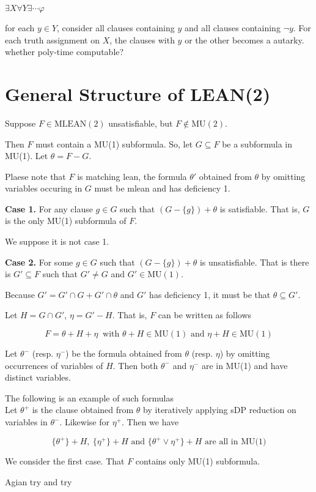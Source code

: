 \documentclass[12pt]{article}
\begin{document}

$\exists X\forall Y\exists \cdots \varphi$ 

for each $y\in Y$, consider all clauses containing $y$ and all clauses containing $\neg y$. For each truth assignment on $X$, the clauses with $y$ or the other becomes a autarky. whether poly-time computable?   


\section{General Structure of LEAN(2)}

Suppose $F\in\text{MLEAN}(2)$ unsatisfiable, but $F\not\in \text{MU}(2)$. 

Then $F$ must contain a MU(1) subformula. So, let $G\subseteq F$ be a subformula in MU(1). Let $\theta=F-G$. 

Plaese note that $F$ is matching lean, the formula $\theta'$ obtained from $\theta$ by omitting variables occuring in $G$ must be mlean and has deficiency 1.  

{\bf Case 1.} For any clause $g\in G$  such that $(G-\{g\})+\theta$ is satisfiable. That is, $G$ is the only MU(1) subformula of $F$. 

We suppose it is not case 1. 

   
{\bf Case 2.} For some $g\in G$ such that $(G-\{g\})+\theta$ is unsatisfiable.
That is there is $G'\subseteq F$ such that $G'\not=G$ and $G'\in \text{MU}(1)$. 

Because $G'=G'\cap G+G'\cap \theta$ and $G'$ has deficiency 1, it must be that $\theta\subseteq G'$. 

Let $H=G\cap G'$, $\eta =G'-H$. That is, $F$ can be written as follows

$$F=\theta+H+\eta\ \text{ with }\theta+H\in \text{MU}(1) \text{ and } \eta+H \in \text{MU}(1)$$ 

Let $\theta^-$ (resp. $\eta^-$) be the formula obtained from $\theta$ (resp. $\eta$) by omitting occurrences of variables of $H$. Then both $\theta^-$ and $\eta^-$ are in MU(1) and have distinct variables. 

The following is an example of such formulas \\


Let $\theta^+$ is the clause obtained from $\theta$ by iteratively applying sDP reduction on variables in $\theta^-$. Likewise for $\eta^+$. Then we have 

$$\{\theta^+\}+H,\ \{\eta^+\}+H \text{ and } \{\theta^+\vee \eta^+\}+H \text{ are all in MU(1)}$$ 


We consider the first case. That $F$ contains only MU(1) subformula.

Agian try and try
\end{document}
